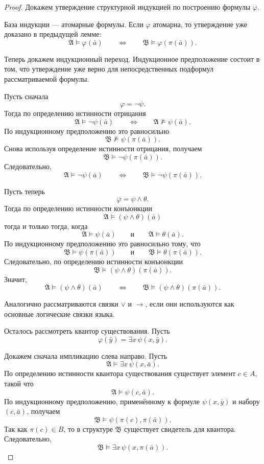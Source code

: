 \documentclass[12pt,a4paper,oneside,openany]{book}
\theoremstyle{definition}
\theoremstyle{plain}
\theoremstyle{remark}
\begin{document}
\begin{proof}
Докажем утверждение структурной индукцией по построению формулы $\varphi$.

База индукции — атомарные формулы. Если $\varphi$ атомарна, то утверждение уже доказано в предыдущей лемме:
\[
\mathfrak A\models \varphi(\bar a)
\qquad
\Longleftrightarrow
\qquad
\mathfrak B\models \varphi(\pi(\bar a)).
\]

Теперь докажем индукционный переход. Индукционное предположение состоит в том, что утверждение уже верно для непосредственных подформул рассматриваемой формулы.

Пусть сначала
\[
\varphi=\neg\psi.
\]
Тогда по определению истинности отрицания
\[
\mathfrak A\models \neg\psi(\bar a)
\qquad
\Longleftrightarrow
\qquad
\mathfrak A\not\models \psi(\bar a).
\]
По индукционному предположению это равносильно
\[
\mathfrak B\not\models \psi(\pi(\bar a)).
\]
Снова используя определение истинности отрицания, получаем
\[
\mathfrak B\models \neg\psi(\pi(\bar a)).
\]
Следовательно,
\[
\mathfrak A\models \neg\psi(\bar a)
\qquad
\Longleftrightarrow
\qquad
\mathfrak B\models \neg\psi(\pi(\bar a)).
\]

Пусть теперь
\[
\varphi=\psi\wedge\theta.
\]
Тогда по определению истинности конъюнкции
\[
\mathfrak A\models(\psi\wedge\theta)(\bar a)
\]
тогда и только тогда, когда
\[
\mathfrak A\models\psi(\bar a)
\qquad\text{и}\qquad
\mathfrak A\models\theta(\bar a).
\]
По индукционному предположению это равносильно тому, что
\[
\mathfrak B\models\psi(\pi(\bar a))
\qquad\text{и}\qquad
\mathfrak B\models\theta(\pi(\bar a)).
\]
Следовательно, по определению истинности конъюнкции
\[
\mathfrak B\models(\psi\wedge\theta)(\pi(\bar a)).
\]
Значит,
\[
\mathfrak A\models(\psi\wedge\theta)(\bar a)
\qquad
\Longleftrightarrow
\qquad
\mathfrak B\models(\psi\wedge\theta)(\pi(\bar a)).
\]

Аналогично рассматриваются связки $\vee$ и $\to$, если они используются как основные логические связки языка.

Осталось рассмотреть квантор существования. Пусть
\[
\varphi(\bar y)=\exists x\,\psi(x,\bar y).
\]

Докажем сначала импликацию слева направо. Пусть
\[
\mathfrak A\models \exists x\,\psi(x,\bar a).
\]
По определению истинности квантора существования существует элемент $c\in A$, такой что
\[
\mathfrak A\models \psi(c,\bar a).
\]
По индукционному предположению, применённому к формуле $\psi(x,\bar y)$ и набору $(c,\bar a)$, получаем
\[
\mathfrak B\models \psi(\pi(c),\pi(\bar a)).
\]
Так как $\pi(c)\in B$, то в структуре $\mathfrak B$ существует свидетель для квантора. Следовательно,
\[
\mathfrak B\models \exists x\,\psi(x,\pi(\bar a)).
\]


\end{proof}
\end{document}
